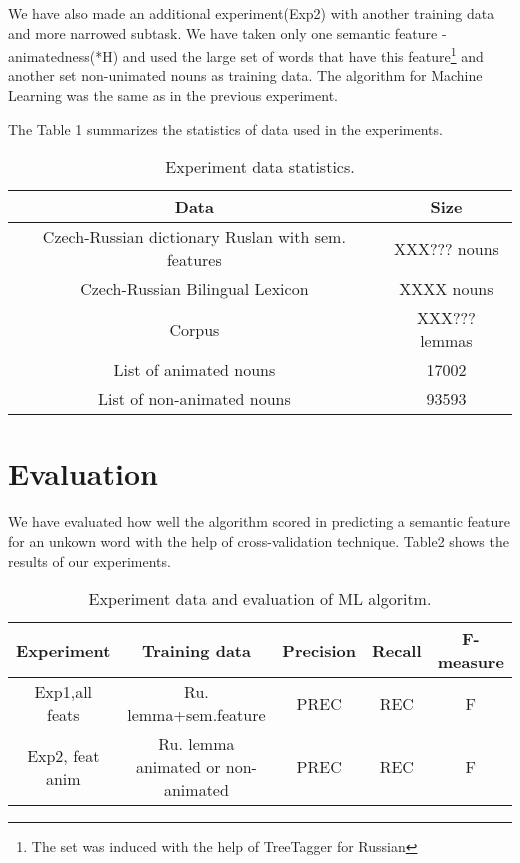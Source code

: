 \documentclass[10pt,a5paper,twoside]{article}
\begin{document}
We have also made an additional experiment(Exp2) with another training data and
more narrowed subtask. We have taken only one semantic feature -
animatedness(*H) and used the large set of words that have this 
feature\footnote{The set was induced with the help of TreeTagger for Russian} 
and another set non-unimated nouns as training data. The algorithm for Machine
Learning was the same as in the previous experiment. 

The Table 1 summarizes the statistics of data used in the experiments.

\begin{table}[!h]
\setcounter{table}{0}
\centering
        \begin{tabular}{|c|c|}
        \hline\hline
        Data&Size\\
        \hline\hline
        Czech-Russian dictionary Ruslan with sem. features&XXX??? nouns\\ %
	\hline
	Czech-Russian Bilingual Lexicon&XXXX nouns\\ %
	\hline
	Corpus& XXX??? lemmas\\%
	\hline
	List of animated nouns&17002\\
	\hline
	List of non-animated nouns&93593\\
	\hline\hline
        \end{tabular}
\caption{Experiment data statistics.}
\label{Table}
\end{table}


\section{Evaluation}

We have evaluated how well the algorithm scored
in predicting a semantic feature for an unkown word 
with the help of cross-validation technique. %
Table2 shows the results of our experiments.
\begin{table}[!h]
\setcounter{table}{0}
\centering
	\begin{tabular}{|c|c|c|c|c|}
	\hline
	Experiment&Training data&Precision&Recall&F-measure\\
	\hline\hline
	Exp1,all feats&Ru. lemma+sem.feature&PREC&REC&F\\%
	\hline
	Exp2, feat anim&Ru. lemma animated or non-animated&PREC&REC&F\\%
	\hline
	\end{tabular}
\caption{Experiment data and evaluation of ML algoritm.}
\label{Table}
\end{table}
\end{document}

